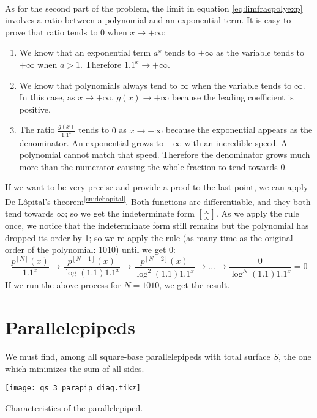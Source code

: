 \paragraph{}
As for the second part of the problem, the limit in equation \ref{eq:limfracpolyexp} involves
a ratio between a polynomial and an exponential term. It is easy to prove that ratio tends
to $0$ when $x \to +\infty$:
\begin{enumerate}
    \item We know that an exponential term $a^x$ tends to $+\infty$ as the variable tends
        to $+\infty$ when $a > 1$. Therefore $1.1^x \to +\infty$.
    \item We know that polynomials always tend to $\infty$ when the variable tends to $\infty$.
        In this case, as $x \to +\infty$, $g(x) \to +\infty$ because the leading coefficient
        is positive.
    \item The ratio $\frac{g(x)}{1.1^x}$ tends to $0$ as $x \to +\infty$ because the exponential
        appears as the denominator. An exponential grows to $+\infty$ with an incredible speed.
        A polynomial cannot match that speed. Therefore the denominator grows much more than
        the numerator causing the whole fraction to tend towards $0$.
\end{enumerate}
If we want to be very precise and provide a proof to the last point, we can apply De L\^{o}pital's
theorem\textsuperscript{\ref{sn:dehopital}}. Both functions are
differentiable,
and they both tend towards $\infty$; so we get the indeterminate
form $\left[ \frac{\infty}{\infty} \right]$. As we apply the rule once, we notice that the
indeterminate form still remains but the polynomial has dropped its order by 1; so we re-apply
the rule (as many time as the original order of the polynomial: $1010$) until we get $0$:
\begin{equation*}
    \frac{p^{[N]}(x)}{1.1^x} \rightarrow \frac{p^{[N-1]}(x)}{\log(1.1)1.1^x}
        \rightarrow \frac{p^{[N-2]}(x)}{\log^2(1.1)1.1^x} \rightarrow \dots \rightarrow
        \frac{0}{\log^N(1.1)1.1^x} = 0
\end{equation*}
If we run the above process for $N=1010$, we get the result.

\section{Parallelepipeds}
\label{sec:paralpyd}
We must find, among all square-base parallelepipeds with total surface $S$, the one
which minimizes the sum of all sides.
%
\begin{marginfigure}
    \texttt{[image: qs\_3\_parapip\_diag.tikz]}
    \caption{Characteristics of the parallelepiped.}%
    \label{fig:pr3parapip}%
\end{marginfigure}
%

